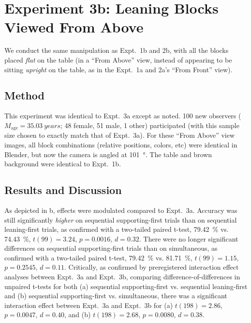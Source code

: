 \section{Experiment 3b: Leaning Blocks Viewed From Above}
We conduct the same manipulation as Expt.~1b and 2b, with all the blocks placed \textit{flat} on the table (in a “From Above” view, instead of appearing to be sitting \textit{upright} on the table, as in the Expt.~1a and 2a’s “From Front” view).

\subsection{Method}
This experiment was identical to Expt.~3a except as noted.  100 new observers ($M_\text{age} = \qty{35.03}{years}$; 48 female, 51 male, 1 other) participated (with this sample size chosen to exactly match that of Expt.~3a).  For these “From Above” view images, all block combinations (relative positions, colors, etc) were identical in Blender, but now the camera is angled at \qty{101}{\degree}.  The table and brown background were identical to Expt.~1b.

\subsection{Results and Discussion}
As depicted in b, effects were modulated compared to Expt.~3a.  Accuracy was still significantly \textit{higher} on sequential supporting-first trials than on sequential leaning-first trials, as confirmed with a two-tailed paired t-test, \qty{79.42}{\percent} vs. \qty{74.43}{\percent}, $t(99) = 3.24$, $p = 0.0016$, $d = 0.32$.  There were no longer significant differences on sequential supporting-first trials than on simultaneous, as confirmed with a two-tailed paired t-test, \qty{79.42}{\percent} vs. \qty{81.71}{\percent}, $t(99) = 1.15$, $p = 0.2545$, $d = 0.11$.  Critically, as confirmed by preregistered interaction effect analyses between Expt.~3a and Expt.~3b, comparing difference-of-differences in unpaired t-tests for both (a) sequential supporting-first vs. sequential leaning-first and (b) sequential supporting-first vs. simultaneous, there was a significant interaction effect between Expt.~3a and Expt.~3b for (a) $t(198) = 2.86$, $p = 0.0047$, $d = 0.40$, and (b) $t(198) = 2.68$, $p = 0.0080$, $d = 0.38$.



